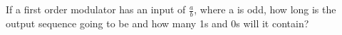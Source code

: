 \subsection{}

If a first order modulator has an input of $\frac{a}{b}$, where a is odd, how long is the output sequence going to be and how many 1s and 0s will it contain?

